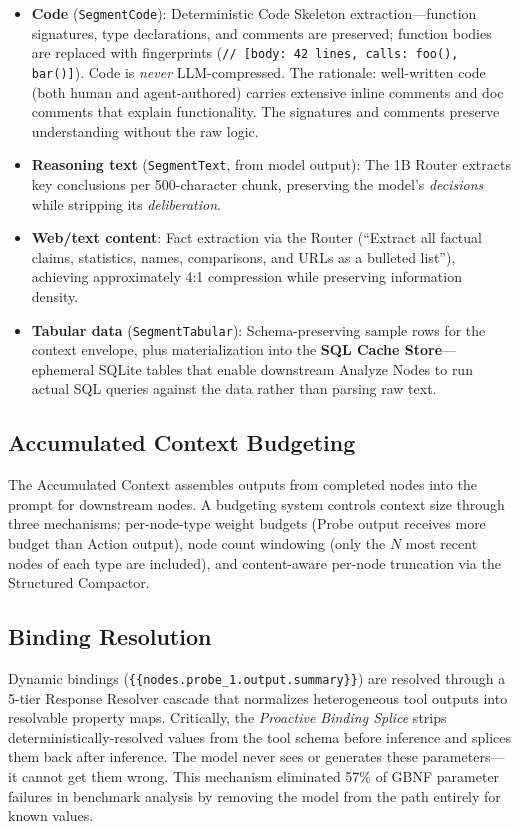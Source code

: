 \documentclass{article}
\begin{document}
\begin{itemize}[leftmargin=*]
\item \textbf{Code} (\texttt{SegmentCode}): Deterministic Code Skeleton extraction---function signatures, type declarations, and comments are preserved; function bodies are replaced with fingerprints (\texttt{// [body: 42 lines, calls: foo(), bar()]}).
Code is \emph{never} LLM-compressed.
The rationale: well-written code (both human and agent-authored) carries extensive inline comments and doc comments that explain functionality.
The signatures and comments preserve understanding without the raw logic.
\item \textbf{Reasoning text} (\texttt{SegmentText}, from model output): The 1B Router extracts key conclusions per 500-character chunk, preserving the model's \emph{decisions} while stripping its \emph{deliberation}.
\item \textbf{Web/text content}: Fact extraction via the Router (``Extract all factual claims, statistics, names, comparisons, and URLs as a bulleted list''), achieving approximately 4:1 compression while preserving information density.
\item \textbf{Tabular data} (\texttt{SegmentTabular}): Schema-preserving sample rows for the context envelope, plus materialization into the \textbf{SQL Cache Store}---ephemeral SQLite tables that enable downstream Analyze Nodes to run actual SQL queries against the data rather than parsing raw text.
\end{itemize}

\subsection{Accumulated Context Budgeting}

The Accumulated Context assembles outputs from completed nodes into the prompt for downstream nodes.
A budgeting system controls context size through three mechanisms:
per-node-type weight budgets (Probe output receives more budget than Action output),
node count windowing (only the $N$ most recent nodes of each type are included), and
content-aware per-node truncation via the Structured Compactor.

\subsection{Binding Resolution}

Dynamic bindings (\texttt{\{\{nodes.probe\_1.output.summary\}\}}) are resolved through a 5-tier Response Resolver cascade that normalizes heterogeneous tool outputs into resolvable property maps.
Critically, the \emph{Proactive Binding Splice} strips deterministically-resolved values from the tool schema before inference and splices them back after inference.
The model never sees or generates these parameters---it cannot get them wrong.
This mechanism eliminated 57\% of GBNF parameter failures in benchmark analysis by removing the model from the path entirely for known values.
\end{document}
